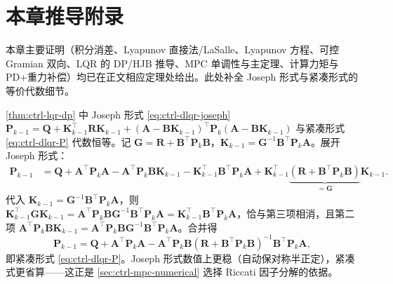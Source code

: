 \section{本章推导附录}
\label{sec:ctrl-appendix}

本章主要证明（积分消差、Lyapunov 直接法/LaSalle、Lyapunov 方程、可控 Gramian 双向、LQR 的 DP/HJB 推导、MPC 单调性与主定理、计算力矩与 PD+重力补偿）均已在正文相应定理处给出。此处补全 Joseph 形式与紧凑形式的等价代数细节。

\begin{derivation}
\cref{thm:ctrl-lqr-dp} 中 Joseph 形式 \cref{eq:ctrl-dlqr-joseph}
$\mathbf{P}_{k-1}=\mathbf{Q}+\mathbf{K}_{k-1}^\top\mathbf{R}\mathbf{K}_{k-1}+(\mathbf{A}-\mathbf{B}\mathbf{K}_{k-1})^\top\mathbf{P}_k(\mathbf{A}-\mathbf{B}\mathbf{K}_{k-1})$ 与紧凑形式 \cref{eq:ctrl-dlqr-P} 代数恒等。记 $\mathbf{G}=\mathbf{R}+\mathbf{B}^\top\mathbf{P}_k\mathbf{B}$，$\mathbf{K}_{k-1}=\mathbf{G}^{-1}\mathbf{B}^\top\mathbf{P}_k\mathbf{A}$。展开 Joseph 形式：
\begin{align*}
  \mathbf{P}_{k-1}&=\mathbf{Q}+\mathbf{A}^\top\mathbf{P}_k\mathbf{A}-\mathbf{A}^\top\mathbf{P}_k\mathbf{B}\mathbf{K}_{k-1}-\mathbf{K}_{k-1}^\top\mathbf{B}^\top\mathbf{P}_k\mathbf{A}
   +\mathbf{K}_{k-1}^\top\underbrace{(\mathbf{R}+\mathbf{B}^\top\mathbf{P}_k\mathbf{B})}_{=\mathbf{G}}\mathbf{K}_{k-1}.
\end{align*}
代入 $\mathbf{K}_{k-1}=\mathbf{G}^{-1}\mathbf{B}^\top\mathbf{P}_k\mathbf{A}$，则 $\mathbf{K}_{k-1}^\top\mathbf{G}\mathbf{K}_{k-1}=\mathbf{A}^\top\mathbf{P}_k\mathbf{B}\mathbf{G}^{-1}\mathbf{B}^\top\mathbf{P}_k\mathbf{A}=\mathbf{K}_{k-1}^\top\mathbf{B}^\top\mathbf{P}_k\mathbf{A}$，恰与第三项相消，且第二项 $\mathbf{A}^\top\mathbf{P}_k\mathbf{B}\mathbf{K}_{k-1}=\mathbf{A}^\top\mathbf{P}_k\mathbf{B}\mathbf{G}^{-1}\mathbf{B}^\top\mathbf{P}_k\mathbf{A}$。合并得
\[
  \mathbf{P}_{k-1}=\mathbf{Q}+\mathbf{A}^\top\mathbf{P}_k\mathbf{A}-\mathbf{A}^\top\mathbf{P}_k\mathbf{B}(\mathbf{R}+\mathbf{B}^\top\mathbf{P}_k\mathbf{B})^{-1}\mathbf{B}^\top\mathbf{P}_k\mathbf{A},
\]
即紧凑形式 \cref{eq:ctrl-dlqr-P}。Joseph 形式数值上更稳（自动保对称半正定），紧凑式更省算——这正是 \cref{sec:ctrl-mpc-numerical} 选择 Riccati 因子分解的依据。
\end{derivation}
